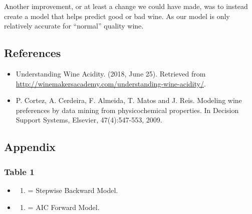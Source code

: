 \documentclass[a4paper,9pt,twocolumn,twoside,]{pinp}
\providecommand{\tightlist}{%
  \setlength{\itemsep}{0pt}\setlength{\parskip}{0pt}}
\begin{document}
Another improvement, or at least a change we could have made, was to
instead create a model that helps predict good or bad wine. As our model
is only relatively accurate for ``normal'' quality wine.

\pagebreak

\subsection{References}\label{references}

\begin{itemize}
\tightlist
\item
  Understanding Wine Acidity. (2018, June 25). Retrieved from
  \url{http://winemakersacademy.com/understanding-wine-acidity/}.
\item
  P. Cortez, A. Cerdeira, F. Almeida, T. Matos and J. Reis. Modeling
  wine preferences by data mining from physicochemical properties. In
  Decision Support Systems, Elsevier, 47(4):547-553, 2009.
\end{itemize}

\subsection{Appendix}\label{appendix}

\subsubsection{Table 1}\label{table-1}

\begin{itemize}
\item
  \begin{enumerate}
  \def\labelenumi{(\arabic{enumi})}
  \tightlist
  \item
    = Stepwise Backward Model.
  \end{enumerate}
\item
  \begin{enumerate}
  \def\labelenumi{(\arabic{enumi})}
  \setcounter{enumi}{1}
  \tightlist
  \item
    = AIC Forward Model.
  \end{enumerate}
\end{itemize}
\end{document}
